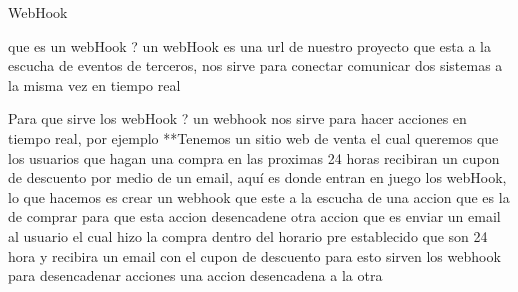 WebHook

que es un webHook ? 
    un webHook es una url de nuestro proyecto que esta a la escucha de eventos de terceros, nos sirve para 
    conectar comunicar dos sistemas a la misma vez en tiempo real

Para que sirve los webHook ?
    un webhook nos sirve para hacer acciones en tiempo real, por ejemplo
    **Tenemos un sitio web de venta el cual queremos que los usuarios que hagan una compra en las 
    proximas 24 horas recibiran un cupon de descuento por medio de un email, aquí es donde entran en 
    juego los webHook, lo que hacemos es crear un webhook que este a la escucha de una accion que es la de 
    comprar para que esta accion desencadene otra accion que es enviar un email al usuario el cual hizo la compra dentro 
    del horario pre establecido que son 24 hora y recibira un email con el cupon de descuento 
    para esto sirven los webhook para desencadenar acciones una accion desencadena a la otra 
 